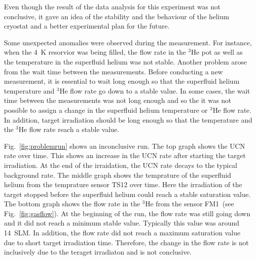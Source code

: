 Even though the result of the data analysis for this experiment was
not conclusive, it gave an idea of the stability and the behaviour of
the helium cryostat and a better experimental plan for the future.

Some unexpected anomalies were observed during the measurement. For
instance, when the 4~K resorvior was being filled, the flow rate in
the $^3$He pot as well as the temperature in the superfluid helium was
not stable. Another problem arose from the wait time between the
measurements. Before conducting a new measurement, it is essential to
wait long enough so that the superfluid helium temperature and $^3$He
flow rate go down to a stable value. In some cases, the wait time
between the measurements was not long enough and so the it was not
possible to assign a change in the superfluid helium temperature or
$^3$He flow rate. In addition, target irradiation should be long
enough so that the temperature and the $^3$He flow rate reach a stable
value.

Fig.~\ref{fig:problemrun} shows an inconclusive run. The top graph
shows the UCN rate over time. This shows an increase in the UCN rate
after starting the target irradiation. At the end of the irraidation,
the UCN rate decays to the typical background rate. The middle graph
shows the temprature of the superfluid helium from the temprature
sensor TS12 over time. Here the irradiation of the target stopped
before the superfluid helium could reach a stable saturation
value. The bottom graph shows the flow rate in the $^3$He from the
sensor FM1~(see Fig.~\ref{fig:gasflow}). At the beginning of the run,
the flow rate was still going down and it did not reach a minimum
stable value. Typically this value was around 14~SLM. In addition, the
flow rate did not reach a maximum saturation value due to short target
irradiation time. Therefore, the change in the flow rate is not
inclusively due to the teraget irradiaton and is not conclusive.



